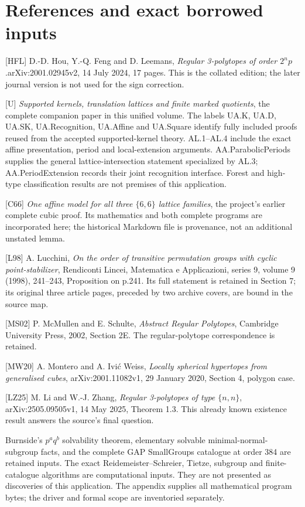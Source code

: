 \section*{References and exact borrowed inputs}
[HFL] D.-D. Hou, Y.-Q. Feng and D. Leemans, \emph{Regular 3-polytopes of order $2^n p$}.\newline arXiv:2001.02945v2, 14 July 2024, 17 pages. This is the collated edition; the later journal version is not used for the sign correction.

[U] \emph{Supported kernels, translation lattices and finite marked quotients}, the complete companion paper in this unified volume. The labels UA.K, UA.D, UA.SK, UA.Recognition, UA.Affine and UA.Square identify fully included proofs reused from the accepted supported-kernel theory. AL.1--AL.4 include the exact affine presentation, period and local-extension arguments. AA.ParabolicPeriods supplies the general lattice-intersection statement specialized by AL.3; AA.PeriodExtension records their joint recognition interface. Forest and high-type classification results are not premises of this application.

[C66] \emph{One affine model for all three $\{6,6\}$ lattice families}, the project's earlier complete cubic proof. Its mathematics and both complete programs are incorporated here; the historical Markdown file is provenance, not an additional unstated lemma.

[L98] A. Lucchini, \emph{On the order of transitive permutation groups with cyclic point-stabilizer}, Rendiconti Lincei, Matematica e Applicazioni, series 9, volume 9 (1998), 241--243, Proposition on p.241. Its full statement is retained in Section 7; its original three article pages, preceded by two archive covers, are bound in the source map.

[MS02] P. McMullen and E. Schulte, \emph{Abstract Regular Polytopes}, Cambridge University Press, 2002, Section 2E. The regular-polytope correspondence is retained.

[MW20] A. Montero and A. Ivi\'c Weiss, \emph{Locally spherical hypertopes from generalised cubes}, arXiv:2001.11082v1, 29 January 2020, Section 4, polygon case.

[LZ25] M. Li and W.-J. Zhang, \emph{Regular 3-polytopes of type $\{n,n\}$}, arXiv:2505.09505v1, 14 May 2025, Theorem 1.3. This already known existence result answers the source's final question.

Burnside's $p^a q^b$ solvability theorem, elementary solvable minimal-normal-subgroup facts, and the complete GAP SmallGroups catalogue at order 384 are retained inputs. The exact Reidemeister--Schreier, Tietze, subgroup and finite-catalogue algorithms are computational inputs. They are not presented as discoveries of this application. The appendix supplies all mathematical program bytes; the driver and formal scope are inventoried separately.
